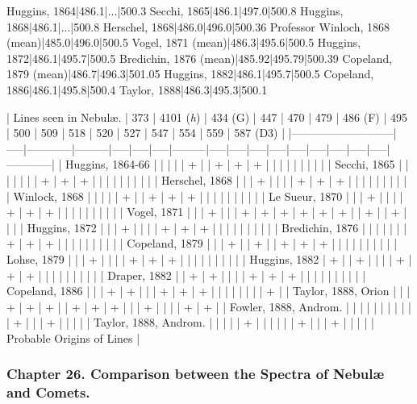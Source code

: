 \documentclass[a4paper, 12pt, oneside, polutonikogreek, english]{article}
\begin{document}
Huggins, 1864|486.1|...|500.3 
Secchi, 1865|486.1|497.0|500.8 
Huggins, 1868|486.1|...|500.8 
Herschel, 1868|486.0|496.0|500.36 
Professor Winloch, 1868 (mean)|485.0|496.0|500.5 
Vogel, 1871 (mean)|486.3|495.6|500.5 
Huggins, 1872|486.1|495.7|500.5 
Bredichin, 1876 (mean)|485.92|495.79|500.39 
Copeland, 1879 (mean)|486.7|496.3|501.05 
Huggins, 1882|486.1|495.7|500.5 
Copeland, 1886|486.1|495.8|500.4 
Taylor, 1888|486.3|495.3|500.1

| Lines seen in Nebulæ.   | 373 | 4101 (\emph{h}) | 434 (G) | 447 | 470 | 479 | 486 (F) | 495 | 500 | 509 | 518 | 520 | 527 | 547 | 554 | 559 | 587 (D3)  |
|---------------------------|-----|------------|---------|-----|-----|-----|---------|-----|-----|-----|-----|-----|-----|-----|-----|-----|------------|
| Huggins, 1864-66     |   |      |     |   | +  |   | +    | +  | +  |   |   |   |   |   |   |   |      |
| Secchi, 1865       |   |      |     |   |   |   | +    | +  | +  |   |   |   |   |   |   |   |      |
| Herschel, 1868      |   |      | +    |   |   |   | +    | +  | +  |   |   |   |   |   |   |   |      |
| Winlock, 1868       |   |      |     |   | +  |   | +    | +  | +  |   |   |   |   |   |   |   |      |
| Le Sueur, 1870      |   |      | +    |   |   |   | +    | +  | +  |   |   |   |   |   |   |   |      |
| Vogel, 1871        |   |      | +    |   |   | +  | +    | +  | +  | +  | +  |   | +  |   | +  |   |      |
| Huggins, 1872       |   |      | +    |   |   |   | +    | +  | +  |   |   |   |   |   |   |   |      |
| Bredichin, 1876      |   |      |     |   |   |   | +    | +  | +  |   |   |   |   |   |   |   |      |
| Copeland, 1879      |   |      | +    |   | +  |   | +    | +  | +  |   |   |   |   |   |   |   |      |
| Lohse, 1879        |   |      | +    |   |   |   | +    | +  | +  |   |   |   |   |   |   |   |      |
| Huggins, 1882       | +  |      | +    |   |   |   | +    | +  | +  |   |   |   |   |   |   |   |      |
| Draper, 1882       |   | +     | +    |   |   |   | +    | +  | +  |   |   |   |   |   |   |   |      |
| Copeland, 1886      |   |      | +    | +  |   |   | +    | +  | +  |   |   |   |   |   |   |   | +     |
| Taylor, 1888, Orion    |   |      | +    | +  | +  |   | +    | +  | +  |   |   | +  |   |   |   | +  | +     |
| Fowler, 1888, Androm.   |   |      |     |   |   |   |     |   |   |   | +  |   |   | +  |   |   |      |
| Taylor, 1888, Androm.   |   |      |     |   | +  |   |     |   |   |   | +  |   |   | +  |   |   |      |
| Probable Origins of Lines |
\clearpage
\subsubsection{Chapter 26. Comparison between the Spectra of Nebulæ and Comets.}
\end{document}
